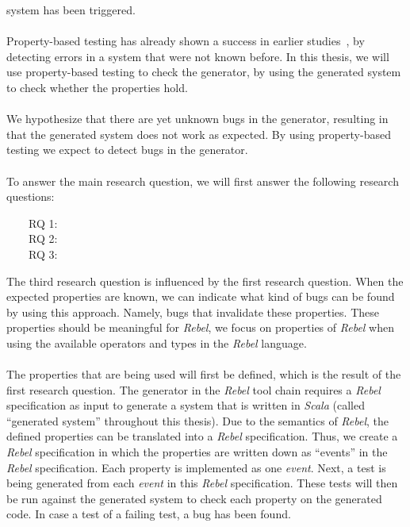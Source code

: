 system has been triggered.\\
\\
Property-based testing has already shown a success in earlier
studies~\cite{fink1997property,claessen2011quickcheck,arts2006testing}, by
detecting errors in a system that were not known before. In this thesis, we will
use property-based testing to check the generator, by using the generated system
to check whether the properties hold.\\
\\
We hypothesize that there are yet unknown bugs in the generator, resulting in
that the generated system does not work as expected. By using property-based
testing we expect to detect bugs in the generator.\\
\\
To answer the main research question, we will first answer the following
research questions:
\begin{description}
\item[~~~~RQ 1:] \rqOne
\item[~~~~RQ 2:] \rqTwo
\item[~~~~RQ 3:] \rqThree
\end{description}
The third research question is influenced by the first research question. When the expected properties are known, we can indicate what kind of bugs can be found by using this approach. Namely, bugs that invalidate these properties. These properties should be meaningful for \textit{Rebel}, we focus on properties of \textit{Rebel} when using the available operators and types in the \textit{Rebel} language.\\
\\
The properties that are being used will first be defined, which is the result of the first research question. The generator in the \textit{Rebel} tool chain requires a \textit{Rebel} specification as input to generate a system that is written in \textit{Scala} (called ``generated system'' throughout this thesis). Due to the semantics of \textit{Rebel}, the defined properties can be translated into a \textit{Rebel} specification. Thus, we create a \textit{Rebel} specification in which the properties are written down as ``events'' in the \textit{Rebel} specification. Each property is implemented as one \textit{event}. Next, a test is being generated from each \textit{event} in this \textit{Rebel} specification. These tests will then be run against the generated system to check each property on the generated code. In case a test of a failing test, a bug has been found.\\
